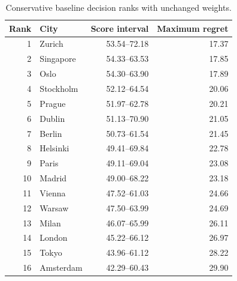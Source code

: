\begin{table}[!ht]\centering
\caption{Conservative baseline decision ranks with unchanged weights.}\label{tab:baseline}
\begin{tabular}{rlrr}\toprule
Rank & City & Score interval & Maximum regret\\\midrule
1 & Zurich & 53.54--72.18 & 17.37 \\
2 & Singapore & 54.33--63.53 & 17.85 \\
3 & Oslo & 54.30--63.90 & 17.89 \\
4 & Stockholm & 52.12--64.54 & 20.06 \\
5 & Prague & 51.97--62.78 & 20.21 \\
6 & Dublin & 51.13--70.90 & 21.05 \\
7 & Berlin & 50.73--61.54 & 21.45 \\
8 & Helsinki & 49.41--69.84 & 22.78 \\
9 & Paris & 49.11--69.04 & 23.08 \\
10 & Madrid & 49.00--68.22 & 23.18 \\
11 & Vienna & 47.52--61.03 & 24.66 \\
12 & Warsaw & 47.50--63.99 & 24.69 \\
13 & Milan & 46.07--65.99 & 26.11 \\
14 & London & 45.22--66.12 & 26.97 \\
15 & Tokyo & 43.96--61.12 & 28.22 \\
16 & Amsterdam & 42.29--60.43 & 29.90 \\
\bottomrule\end{tabular}\end{table}
